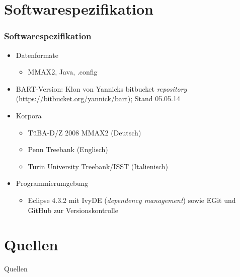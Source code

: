 \documentclass[11pt,a4paper]{beamer}
\begin{document}
\section{Softwarespezifikation}

\begin{frame}
\frametitle{Softwarespezifikation}

\begin{itemize}

	\item Datenformate
		\begin{itemize}
		\item MMAX2, Java, .config
	\end{itemize}
	\item BART-Version: Klon von Yannicks bitbucket \textit{repository} (\url{https://bitbucket.org/yannick/bart}); Stand 05.05.14 
	\item Korpora
	\begin{itemize}
		\item TüBA-D/Z 2008 MMAX2 (Deutsch)
		\item Penn Treebank (Englisch)
		\item Turin University Treebank/ISST (Italienisch)
	\end{itemize}
	\item Programmierumgebung
	\begin{itemize}
		\item Eclipse 4.3.2 mit IvyDE (\textit{dependency management}) sowie EGit und GitHub zur Versionskontrolle
	\end{itemize}

\end{itemize}

\end{frame}

\section{Quellen}
\begin{frame}{Quellen}
\nocite{*}


\end{frame}
\end{document}
